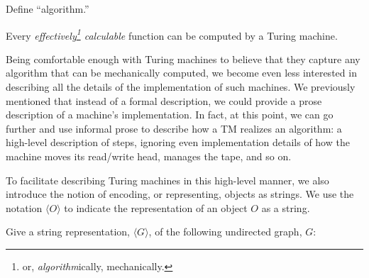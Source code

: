 \documentclass[twoside,letterpaper,openany]{book}
\begin{document}
\begin{exer}
Define ``algorithm.''
\end{exer}

\begin{conjecture}
Every \emph{effectively\footnote{or, \emph{algorithm}ically, mechanically.} calculable} function can be computed by a Turing machine.
\end{conjecture}
 
 
\newcommand\repof[1]{{\langle{#1}\rangle}}

\begin{discussion}
Being comfortable enough with Turing machines to believe that they capture any algorithm that can be mechanically computed, we become even less interested in describing all the details of the implementation of such machines. We previously mentioned that instead of a formal description, we could provide a prose description of a machine's implementation. In fact, at this point, we can go further and use informal prose to describe how a TM realizes an algorithm: a high-level description of steps, ignoring even implementation details of how the machine moves its read/write head, manages the tape, and so on.

To facilitate describing Turing machines in this high-level manner, we also introduce the notion of encoding, or representing, objects as strings. We use the notation $\repof O$ to indicate the representation of an object $O$ as a string.
\end{discussion}

\begin{exer2}
Give a string representation, $\repof G$, of the following undirected graph, $G$:

\begin{center}
\end{center}
\end{exer2}
\end{document}
